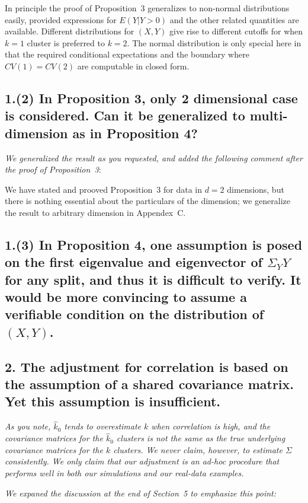 \documentclass[11pt]{article}
\begin{document}
In principle the proof of Proposition~3 generalizes to non-normal
distributions easily, provided expressions for $E(Y | Y > 0)$ and the other
related quantities are available. Different distributions for $(X,Y)$ give
rise to different cutoffs for when $k = 1$ cluster is preferred to $k = 2$.
The normal distribution is only special here in that the required conditional
expectations and the boundary where $CV(1) = CV(2)$ are computable in closed
form. 


\subsection{1.(2) In Proposition 3, only 2 dimensional case is considered. Can
it be generalized to multi-dimension as in Proposition 4?}

\emph{We generalized the result as you requested, and added the following
comment after the proof of Proposition~3}: 

We have stated and prooved Proposition~3 for data in $d = 2$
dimensions, but there is nothing essential about the particulars of the
dimension; we generalize the result to arbitrary dimension in
Appendex~C.


\subsection{1.(3) In Proposition 4, one assumption is posed on the first eigenvalue
and eigenvector of $\Sigma_YY$ for any split, and thus it is difficult to
verify. It would be more convincing to assume a verifiable condition on the
distribution of $(X, Y)$.}


\subsection{2. The adjustment for correlation is based on the assumption of a
shared covariance matrix. Yet this assumption is insufficient.}

\emph{As you note, $\hat{k}_0$ tends to overestimate $k$ when correlation is high,
and the covariance matrices for the  $\hat{k}_0$ clusters is not the same as
the true underlying covariance matrices for the $k$ clusters. We never claim,
however, to estimate $\Sigma$ consistently. We only claim that our adjustment
is an ad-hoc procedure that performs well in both our simulations and our
real-data examples.}

\emph{We expaned the discussion at the end of Section~5 to emphasize this point:}
\end{document}
